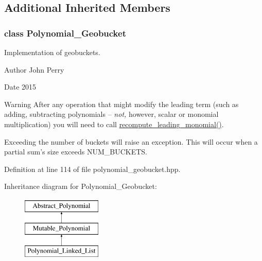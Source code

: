 \subsection*{Additional Inherited Members}
\label{class_polynomial___geobucket}
\subsubsection{class Polynomial\+\_\+\+Geobucket}
Implementation of geobuckets. 

\begin{DoxyAuthor}{Author}
John Perry 
\end{DoxyAuthor}
\begin{DoxyDate}{Date}
2015 
\end{DoxyDate}
\begin{DoxyWarning}{Warning}
After any operation that might modify the leading term (such as adding, subtracting polynomials -- {\itshape not,} however, scalar or monomial multiplication) you will need to call \hyperlink{group__polygroup_ab57dbe8d5f0d3860997775d9f354ab0c}{recompute\+\_\+leading\+\_\+monomial()}. 

Exceeding the number of buckets will raise an exception. This will occur when a partial sum's size exceeds {\ttfamily N\+U\+M\+\_\+\+B\+U\+C\+K\+E\+TS}. 
\end{DoxyWarning}


Definition at line 114 of file polynomial\+\_\+geobucket.\+hpp.

Inheritance diagram for Polynomial\+\_\+\+Geobucket\+:\begin{figure}[H]
\begin{center}
\leavevmode
\includegraphics[height=3.000000cm]{group__polygroup}
\end{center}
\end{figure}
